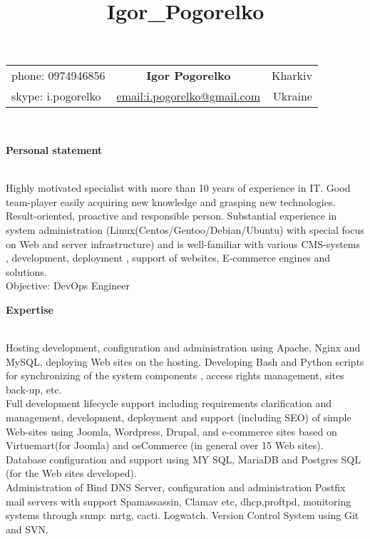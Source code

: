 \documentclass[letterpaper]{article}
\date{}
\title{Igor\_Pogorelko}
\makeatletter
\newcommand{\resheader}[6]{
    \begin{tabular*}{\textwidth}{l@{\extracolsep{\fill}}cr}
    #3 & \textbf{\LARGE #1} & #5\\
    #4 & \url{#2}           & #6\\
    \end{tabular*}
    \\
    \vspace{0.1in}
}
\renewcommand{\section}[1]{
  {
    \large \colorbox{my-gray}{
      \begin{minipage}
        {\textwidth-0.175in}
        {\textbf{#1 \vphantom{p\^{E}}}}
      \end{minipage}
    }
  }
}
\renewcommand\maketitle{}
\makeatother
\begin{document}
\maketitle
\resheader{ Igor Pogorelko }{ email:i.pogorelko@gmail.com }{ phone: 0974946856 }{ skype: i.pogorelko }{ Kharkiv }{ Ukraine }
\section{Personal statement}
\label{sec-1-1}
\\
Highly motivated specialist with more than 10 years of experience in IT. Good team-player easily acquiring new knowledge and grasping new technologies.\\
Result-oriented, proactive and responsible person. 
Substantial experience in system administration (Linux(Centos/Gentoo/Debian/Ubuntu) with special focus on Web and server infrastructure) and is well-familiar with various CMS-systems , development, deployment , support  of websites, E-commerce engines and solutions.\\
\vspace*{1em plus .6em minus .5em}
Objective:  DevOps Engineer\\
\section{Expertise}
\label{sec-1-1}
\\
Hosting development, configuration and administration using Apache, Nginx and MySQL, deploying Web sites on the hosting. Developing Bash and Python scripts for synchronizing of the system components , access rights management, sites back-up, etc.\\
Full development lifecycle support including requirements clarification and management, development, deployment and support (including SEO) of simple Web-sites using Joomla, Wordpress, Drupal, and e-commerce sites based on Virtuemart(for Joomla) and osCommerce (in general over 15 Web sites). Database configuration and support using MY SQL, MariaDB and Postgres SQL (for the Web sites developed).\\
Administration of Bind DNS Server, configuration and administration Postfix mail servers with support Spamassassin, Clamav etc, dhcp,proftpd, monitoring systems through snmp: mrtg, cacti. Logwatch. Version Control System using Git and SVN.
\end{document}
